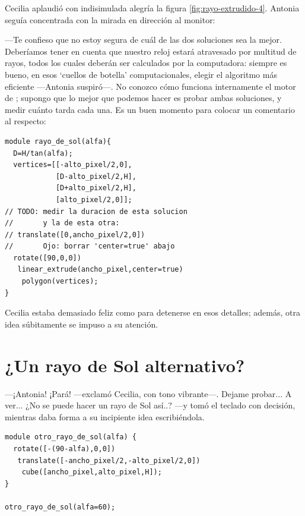 Cecilia aplaudió con indisimulada alegría la figura
\ref{fig:rayo-extrudido-4}. Antonia seguía concentrada con la mirada
en dirección al monitor:

---Te confieso que no estoy segura de cuál de las dos soluciones sea
la mejor. Deberíamos tener en cuenta que nuestro reloj estará
atravesado por multitud de rayos, todos los cuales deberán ser
calculados por la computadora: siempre es bueno, en esos `cuellos de
botella' computacionales, elegir el algoritmo más eficiente ---Antonia
suspiró---. No conozco cómo funciona internamente el motor de
\openscad{}; supongo que lo mejor que podemos hacer es probar ambas
soluciones, y medir cuánto tarda cada una. Es un buen momento para
colocar un comentario al respecto:




\begin{lstlisting}
module rayo_de_sol(alfa){
  D=H/tan(alfa);
  vertices=[[-alto_pixel/2,0],
            [D-alto_pixel/2,H],
            [D+alto_pixel/2,H],
            [alto_pixel/2,0]];
// TODO: medir la duracion de esta solucion
//       y la de esta otra:
// translate([0,ancho_pixel/2,0])
//       Ojo: borrar 'center=true' abajo
  rotate([90,0,0])
   linear_extrude(ancho_pixel,center=true)
    polygon(vertices);
}
\end{lstlisting}


Cecilia estaba demasiado feliz como para detenerse en esos detalles;
además, otra idea súbitamente se impuso a su atención.

\section{¿Un rayo de Sol alternativo?}

---¡Antonia! ¡Pará! ---exclamó Cecilia, con tono vi\-bran\-te---.  Dejame
probar... A ver... ¿No se puede hacer un rayo de Sol así..? ---y tomó
el teclado con decisión, mientras daba forma a su incipiente idea
escribiéndola.

\begin{lstlisting}
module otro_rayo_de_sol(alfa) {
  rotate([-(90-alfa),0,0])
   translate([-ancho_pixel/2,-alto_pixel/2,0])
    cube([ancho_pixel,alto_pixel,H]);  
}

otro_rayo_de_sol(alfa=60);
\end{lstlisting}


